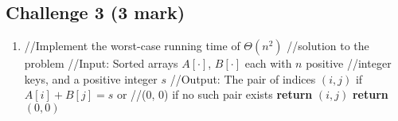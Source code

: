 \documentclass[11pt]{article}
\begin{document}
\subsection*{Challenge 3 \hfill {\small (3 mark)}}
\begin{enumerate}
\item
\begin{algorithmic}[1]
    \State //Implement the worst-case running time of $\Theta(n^2)$
    \State //solution to the problem
    \State //Input: Sorted arrays $A[\cdot]$, $B[\cdot]$ each with $n$ positive
    \State //integer keys, and a positive integer $s$
    \State //Output: The pair of indices $(i, j)$ if $A[i]+B[j]=s$ or
    \State //(0, 0) if no such pair exists
                    \State \textbf{return} $(i, j)$
                \EndIf
            \EndFor
        \EndFor
    \State \textbf{return} $(0, 0)$
    \EndFunction
\end{algorithmic}
~


\end{enumerate}
\end{document}

